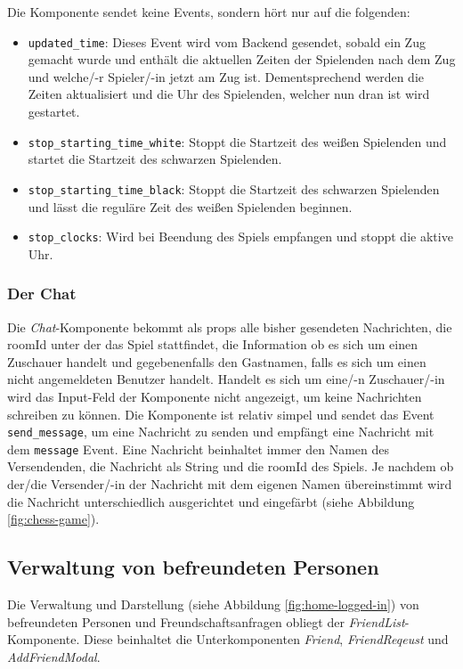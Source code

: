 Die Komponente sendet keine Events, sondern hört nur auf die folgenden:
\begin{itemize}
\item \verb|updated_time|: Dieses Event wird vom Backend gesendet, sobald ein Zug gemacht wurde und enthält die aktuellen Zeiten der Spielenden nach dem Zug und welche/-r Spieler/-in jetzt am Zug ist. Dementsprechend werden die Zeiten aktualisiert und die Uhr des Spielenden, welcher nun dran ist wird gestartet.
\item \verb|stop_starting_time_white|: Stoppt die Startzeit des weißen Spielenden und startet die Startzeit des schwarzen Spielenden.
\item \verb|stop_starting_time_black|: Stoppt die Startzeit des schwarzen Spielenden und lässt die reguläre Zeit des weißen Spielenden beginnen.
\item \verb|stop_clocks|: Wird bei Beendung des Spiels empfangen und stoppt die aktive Uhr.
\end{itemize}

\subsubsection{Der Chat}
Die \textit{Chat}-Komponente bekommt als props alle bisher gesendeten Nachrichten, die roomId unter der das Spiel stattfindet, die Information ob es sich um einen Zuschauer handelt und gegebenenfalls den Gastnamen, falls es sich um einen nicht angemeldeten Benutzer handelt. Handelt es sich um eine/-n Zuschauer/-in wird das Input-Feld der Komponente nicht angezeigt, um keine Nachrichten schreiben zu können. Die Komponente ist relativ simpel und sendet das Event \verb|send_message|, um eine Nachricht zu senden und empfängt eine Nachricht mit dem \verb|message| Event. Eine Nachricht beinhaltet immer den Namen des Versendenden, die Nachricht als String und die roomId des Spiels. Je nachdem ob der/die Versender/-in der Nachricht mit dem eigenen Namen übereinstimmt wird die Nachricht unterschiedlich ausgerichtet und eingefärbt (siehe Abbildung \ref{fig:chess-game}).

\subsection{Verwaltung von befreundeten Personen}
\label{sec:Friends}
Die Verwaltung und Darstellung (siehe Abbildung \ref{fig:home-logged-in}) von befreundeten Personen und Freundschaftsanfragen obliegt der \textit{FriendList}-Komponente. Diese beinhaltet die Unterkomponenten \textit{Friend}, \textit{FriendReqeust} und \textit{AddFriendModal}.

